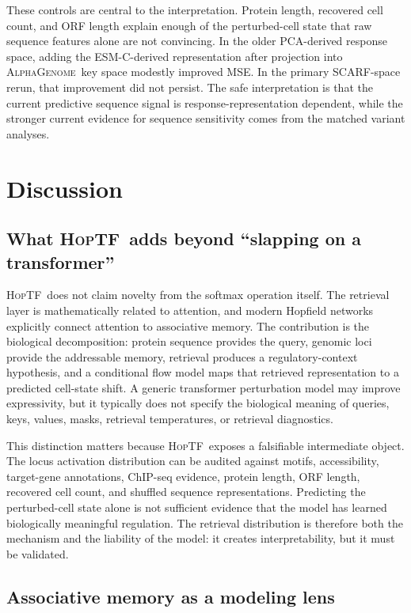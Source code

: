 \documentclass[11pt]{article}
\newcommand{\hoptf}{\textsc{HopTF}}
\newcommand{\ag}{\textsc{AlphaGenome}}
\newcommand{\scarf}{\textsc{SCARF}}
\newcommand{\esm}{\textsc{ESM-C}}
\begin{document}
These controls are central to the interpretation. Protein length, recovered cell count, and ORF length explain enough of the perturbed-cell state that raw sequence features alone are not convincing. In the older PCA-derived response space, adding the \esm-derived representation after projection into \ag\ key space modestly improved MSE. In the primary \scarf-space rerun, that improvement did not persist. The safe interpretation is that the current predictive sequence signal is response-representation dependent, while the stronger current evidence for sequence sensitivity comes from the matched variant analyses.

\section{Discussion}

\subsection{What \hoptf\ adds beyond ``slapping on a transformer''}

\hoptf\ does not claim novelty from the softmax operation itself. The retrieval layer is mathematically related to attention, and modern Hopfield networks explicitly connect attention to associative memory. The contribution is the biological decomposition: protein sequence provides the query, genomic loci provide the addressable memory, retrieval produces a regulatory-context hypothesis, and a conditional flow model maps that retrieved representation to a predicted cell-state shift. A generic transformer perturbation model may improve expressivity, but it typically does not specify the biological meaning of queries, keys, values, masks, retrieval temperatures, or retrieval diagnostics.

This distinction matters because \hoptf\ exposes a falsifiable intermediate object. The locus activation distribution can be audited against motifs, accessibility, target-gene annotations, ChIP-seq evidence, protein length, ORF length, recovered cell count, and shuffled sequence representations. Predicting the perturbed-cell state alone is not sufficient evidence that the model has learned biologically meaningful regulation. The retrieval distribution is therefore both the mechanism and the liability of the model: it creates interpretability, but it must be validated.

\subsection{Associative memory as a modeling lens}
\end{document}
